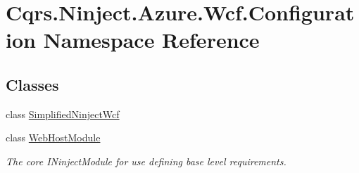\hypertarget{namespaceCqrs_1_1Ninject_1_1Azure_1_1Wcf_1_1Configuration}{}\section{Cqrs.\+Ninject.\+Azure.\+Wcf.\+Configuration Namespace Reference}
\label{namespaceCqrs_1_1Ninject_1_1Azure_1_1Wcf_1_1Configuration}
\subsection*{Classes}
\begin{DoxyCompactItemize}
\item 
class \hyperlink{classCqrs_1_1Ninject_1_1Azure_1_1Wcf_1_1Configuration_1_1SimplifiedNinjectWcf}{Simplified\+Ninject\+Wcf}
\item 
class \hyperlink{classCqrs_1_1Ninject_1_1Azure_1_1Wcf_1_1Configuration_1_1WebHostModule}{Web\+Host\+Module}
\begin{DoxyCompactList}\small\item\em The core I\+Ninject\+Module for use defining base level requirements. \end{DoxyCompactList}\end{DoxyCompactItemize}
